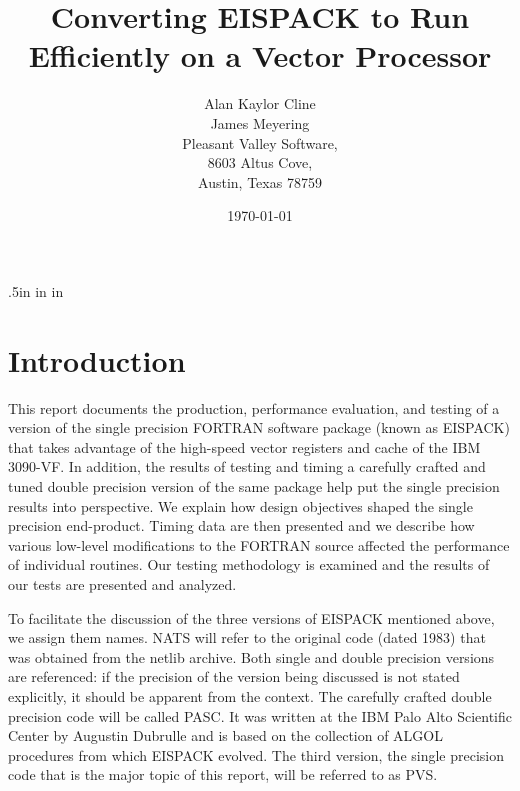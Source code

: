 \renewcommand{\baselinestretch}{1.25}
\oddsidemargin 0.5cm
\evensidemargin 0.5cm
\topmargin .5in
\headheight 0pt
\headsep 0pt
 in
 in

\title{Converting EISPACK to Run Efficiently on a Vector Processor}

\author{  Alan Kaylor Cline \\
          James Meyering \\[.2in]
          Pleasant Valley Software, \\
          8603 Altus Cove, \\
          Austin, Texas 78759 \\[.2in] }

\date{\today}




\maketitle

\section{Introduction}

This report documents the production, performance evaluation, and testing
of a version of the single precision FORTRAN software package (known as EISPACK)
that takes advantage of the high-speed vector registers and cache of the
IBM 3090-VF.
In addition, the results of testing and timing a carefully crafted and tuned
double precision version of the same package help put the single precision
results into perspective.
We explain how design objectives shaped the single precision end-product.
Timing data are then presented and we describe how various low-level
modifications to the FORTRAN source affected the performance of individual
routines.
Our testing methodology is examined and the results of our tests are
presented and analyzed.

To facilitate the discussion of the three versions of EISPACK mentioned above,
we assign them names.  NATS will refer to the original code (dated 1983) that 
was obtained from the netlib archive.  Both single and double precision
versions are referenced: if the precision of the version being
discussed is not stated explicitly, it should be apparent from the context.
The carefully crafted double precision code will be called PASC.
It was written at the IBM Palo Alto Scientific Center by Augustin Dubrulle
and is based on the collection of ALGOL procedures from which EISPACK evolved.
The third version, the single precision code that is the major topic of this
report, will be referred to as PVS.

